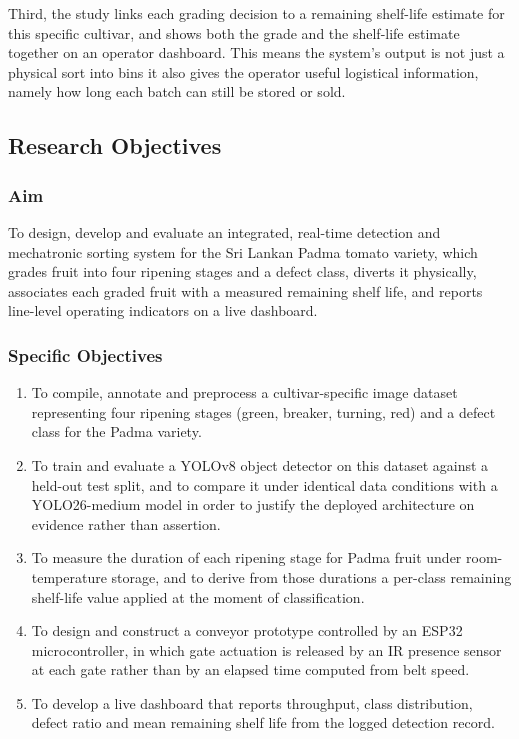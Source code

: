Third, the study links each grading decision to a remaining shelf-life estimate for this specific cultivar, and shows both the grade and the shelf-life estimate together on an operator dashboard. This means the system's output is not just a physical sort into bins it also gives the operator useful logistical information, namely how long each batch can still be stored or sold.


\subsection{Research Objectives}
\label{sec:objectives}

\subsubsection{Aim}

To design, develop and evaluate an integrated, real-time detection and mechatronic sorting system for the Sri Lankan Padma tomato variety, which grades fruit into four ripening stages and a defect class, diverts it physically, associates each graded fruit with a measured remaining shelf life, and reports line-level operating indicators on a live dashboard.

\subsubsection{Specific Objectives}

\begin{enumerate}
    \item To compile, annotate and preprocess a cultivar-specific image dataset representing four ripening stages (green, breaker, turning, red) and a defect class for the Padma variety.
    \item To train and evaluate a YOLOv8 object detector on this dataset against a held-out test split, and to compare it under identical data conditions with a YOLO26-medium model in order to justify the deployed architecture on evidence rather than assertion.
    
    \item To measure the duration of each ripening stage for Padma fruit under room-temperature storage, and to derive from those durations a per-class remaining shelf-life value applied at the moment of classification.
    \item To design and construct a conveyor prototype controlled by an ESP32 microcontroller, in which gate actuation is released by an \acrfull{IR} presence sensor at each gate rather than by an elapsed time computed from belt speed.
    \item To develop a live dashboard that reports throughput, class distribution, defect ratio and mean remaining shelf life from the logged detection record.
\end{enumerate}

